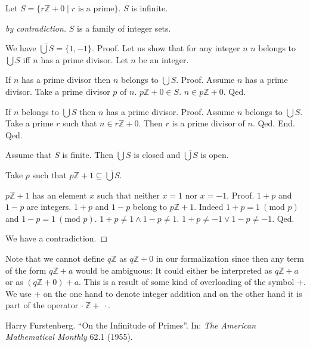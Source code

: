 \documentclass{article}
\renewcommand{\mod}{\text{mod }}
\newcommand{\Int}{\mathbb{Z}}
\begin{document}
  \begin{forthel}
    \begin{theorem}[Fuerstenberg]
      Let $S = \{ r \Int + 0 \mid r \text{ is a prime} \}$.
      $S$ is infinite.
    \end{theorem}
    \begin{proof}[by contradiction]
      $S$ is a family of integer sets.

      We have $\overline{\bigcup S} = \{ 1, -1 \}$. \newline
      Proof.
        Let us show that for any integer $n$ $n$ belongs to $\bigcup S$ iff $n$ has a prime divisor.
          Let $n$ be an integer.

          If $n$ has a prime divisor then $n$ belongs to $\bigcup S$. \newline
          Proof.
            Assume $n$ has a prime divisor.
            Take a prime divisor $p$ of $n$.
            $p \Int + 0 \in S$.
            $n \in p \Int + 0$.
          Qed.

          If $n$ belongs to $\bigcup S$ then $n$ has a prime divisor. \newline
          Proof.
            Assume $n$ belongs to $\bigcup S$.
            Take a prime $r$ such that $n \in r \Int + 0$.
            Then $r$ is a prime divisor of $n$.
          Qed.
        End.
      Qed.

      Assume that $S$ is finite.
      Then $\bigcup S$ is closed and $\overline{\bigcup S}$ is open.

      Take $p$ such that $p \Int + 1 \subseteq \overline{\bigcup S}$.

      $p \Int + 1$ has an element $x$ such that neither $x = 1$ nor $x = -1$. \newline
      Proof.
        $1 + p$ and $1 - p$ are integers.
        $1 + p$ and $1 - p$ belong to $p \Int + 1$.
        Indeed $1 + p = 1 ~(\mod p)$ and $1 - p = 1 ~(\mod p)$.
        $1 + p \neq  1 \wedge 1 - p \neq  1$.
        $1 + p \neq -1 \vee 1 - p \neq -1$.
      Qed.

      We have a contradiction.
    \end{proof}
  \end{forthel}

  Note that we cannot define $q \Int$ as $q \Int + 0$ in our formalization since then any term of
  the form $q \Int + a$ would be ambiguous: It could either be interpreted as $q \Int + a$ or as
  $(q \Int + 0) + a$. This is a result of some kind of overloading of the symbol $+$. We use $+$ on
  the one hand to denote integer addition and on the other hand it is part of the operator
  $\cdot ~ \Int + ~ \cdot$.

  \begin{thebibliography}{1}
    Harry Furstenberg.
    ``On the Infinitude of Primes''.
    In: \textit{The American Mathematical Monthly} 62.1 (1955).
  \end{thebibliography}
\end{document}
